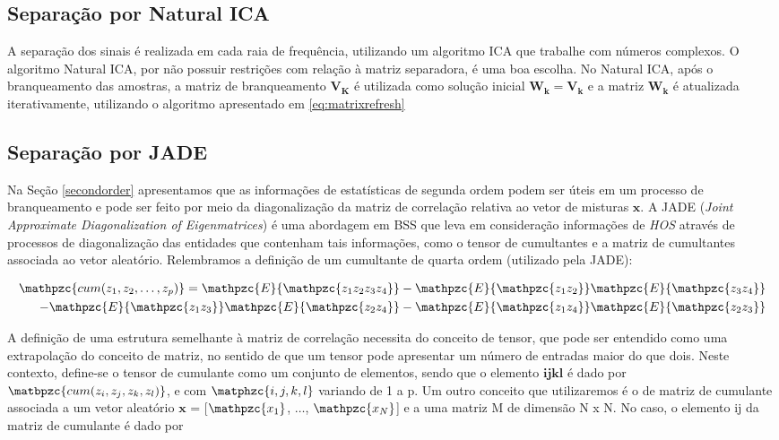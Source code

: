     \subsection{Separação por Natural ICA}
    A separação dos sinais é realizada em cada raia de frequência, utilizando um algoritmo ICA que trabalhe com números complexos. O algoritmo Natural ICA, por não possuir restrições com relação à matriz separadora, é uma boa escolha.
    No Natural ICA, após o branqueamento das amostras, a matriz de branqueamento $\mathbf{V_K}$ é utilizada como solução inicial $\mathbf{W_k = V_k}$ e a matriz $\mathbf{W_k}$ é atualizada iterativamente, utilizando o algoritmo apresentado em \ref{eq:matrixrefresh}
    
    \subsection{Separação por JADE}
    Na Seção \ref{secondorder} apresentamos que as informações de estatísticas de segunda ordem podem ser úteis em um processo de branqueamento e pode ser feito por meio da diagonalização da matriz de correlação relativa ao vetor de misturas $\mathbf{x}$. A JADE (\textit{Joint Approximate Diagonalization of Eigenmatrices})\cite{JADE} é uma abordagem em BSS que leva em consideração informações de \textit{HOS} através de processos de diagonalização das entidades que contenham tais informações, como o tensor de cumultantes e a matriz de cumultantes associada ao vetor aleatório. Relembramos a definição de um cumultante de quarta ordem (utilizado pela JADE):
    
    \begin{equation}
        \label{cumJADE}
        \begin{split}
        \mathpzc{cum(z_1,z_2,\dots,z_p)} = \mathpzc{E}\{\mathpzc{z_1z_2z_3z_4}\} - \mathpzc{E}\{\mathpzc{z_1z_2}\}\mathpzc{E}\{\mathpzc{z_3z_4}\} & \\ - \mathpzc{E}\{\mathpzc{z_1z_3}\}\mathpzc{E}\{\mathpzc{z_2z_4}\} - \mathpzc{E}\{\mathpzc{z_1z_4}\}\mathpzc{E}\{\mathpzc{z_2z_3}\}    
        \end{split}
    \end{equation}
    
    A definição de uma estrutura semelhante à matriz de correlação necessita do conceito de tensor, que pode ser entendido como uma extrapolação do conceito de matriz, no sentido de que um tensor pode apresentar um número de  entradas maior do que dois. Neste contexto, define-se o tensor de cumulante como um conjunto de elementos, sendo
que o elemento $\mathbf{ijkl}$ é dado por $\matbpzc{cum(z_i, z_j, z_k, z_l)}$, e com $\matphzc{i,j,k,l}$ variando de 1 a p.
    Um outro conceito que utilizaremos é o de matriz de cumulante associada a um vetor aleatório $\mathbf{x}$ = [$\mathpzc{x_1}$, $\dots$,  $\mathpzc{x_N}$] e a uma matriz M de dimensão N x N. No caso, o elemento ij da matriz de cumulante é dado por
    
